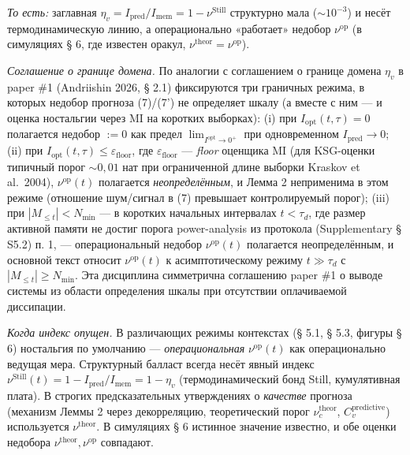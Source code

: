\documentclass[pdflatex,sn-mathphys-ay]{sn-jnl}
\begin{document}
\emph{То есть:} заглавная \(\eta_v = I_{\text{pred}}/I_{\text{mem}} = 1 - \nu^{\text{Still}}\) структурно мала (\(\sim 10^{-3}\)) и несёт термодинамическую линию, а операционально «работает» недобор \(\nu^{\text{op}}\) (в симуляциях § 6, где известен оракул, \(\nu^{\text{theor}} = \nu^{\text{op}}\)).



\emph{Соглашение о границе домена.} По аналогии с соглашением о границе домена \(\eta_v\) в paper \#1 (Andriishin 2026, § 2.1) фиксируются три граничных режима, в которых недобор прогноза (7)/(7') не определяет шкалу (а вместе с ним --- и оценка ностальгии через MI на коротких выборках): (i) при \(I_{\text{opt}}(t, \tau) = 0\) полагается недобор \(:= 0\) как предел \(\lim_{I^{\text{opt}} \to 0^+}\) при одновременном \(I_{\text{pred}} \to 0\); (ii) при \(I_{\text{opt}}(t, \tau) \le \varepsilon_{\text{floor}}\), где \(\varepsilon_{\text{floor}}\) --- \emph{floor} оценщика MI (для KSG-оценки типичный порог \(\sim 0{,}01\) нат при ограниченной длине выборки Kraskov et al.~2004), \(\nu^{\text{op}}(t)\) полагается \emph{неопределённым}, и Лемма 2 неприменима в этом режиме (отношение шум/сигнал в (7) превышает контролируемый порог); (iii) при \(|M_{\le t}| < N_{\min}\) --- в коротких начальных интервалах \(t < \tau_d\), где размер активной памяти не достиг порога power-analysis из протокола (Supplementary § S5.2) п. 1, --- операциональный недобор \(\nu^{\text{op}}(t)\) полагается неопределённым, и основной текст относит \(\nu^{\text{op}}(t)\) к асимптотическому режиму \(t \gg \tau_d\) с \(|M_{\le t}| \ge N_{\min}\). Эта дисциплина симметрична соглашению paper \#1 о выводе системы из области определения шкалы при отсутствии оплачиваемой диссипации.



\emph{Когда индекс опущен.} В различающих режимы контекстах (§ 5.1, § 5.3, фигуры § 6) ностальгия по умолчанию --- \emph{операциональная} \(\nu^{\text{op}}(t)\) как операционально ведущая мера. Структурный балласт всегда несёт явный индекс \(\nu^{\text{Still}}(t) = 1 - I_{\text{pred}}/I_{\text{mem}} = 1 - \eta_v\) (термодинамический бонд Still, кумулятивная плата). В строгих предсказательных утверждениях о \emph{качестве} прогноза (механизм Леммы 2 через декорреляцию, теоретический порог \(\nu_c^{\text{theor}}\), \(C_v^{\text{predictive}}\)) используется \(\nu^{\text{theor}}\). В симуляциях § 6 истинное значение известно, и обе оценки недобора \(\nu^{\text{theor}}, \nu^{\text{op}}\) совпадают.
\end{document}
